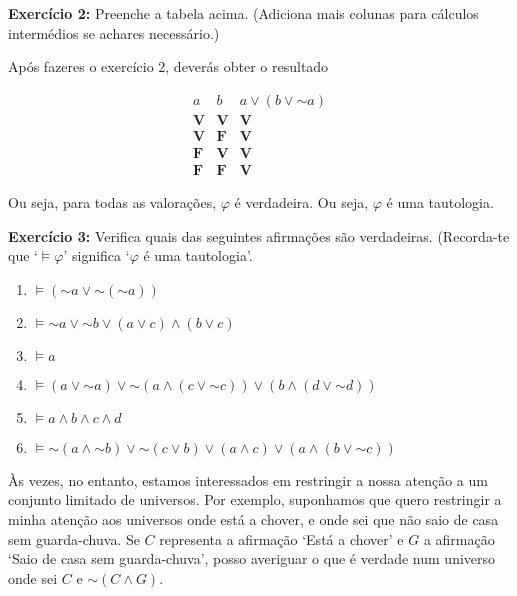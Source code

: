 \documentclass{article}
\theoremstyle{definition}
\theoremstyle{remark}
\newcommand{\V}{\mathbf{V}}
\newcommand{\F}{\mathbf{F}}
\newcommand*{\lneg}{\mathord{\sim}}
\begin{document}
	\textbf{Exercício 2:} Preenche a tabela acima. (Adiciona mais colunas para cálculos intermédios se achares necessário.)
	
	\smallskip
	
	Após fazeres o exercício 2, deverás obter o resultado
	
	\[
	\begin{array}{c|c|c}
	a & b & a \lor (b \lor \lneg a)\\
	\hline
	\V & \V &\V\\
	\V & \F &\V\\
	\F & \V &\V\\
	\F & \F &\V
	\end{array}
	\]
	
	Ou seja, para todas as valorações, $\varphi$ é verdadeira. Ou seja, $\varphi$ é uma tautologia.
	
	\smallskip
	
	\textbf{Exercício 3:} Verifica quais das seguintes afirmações são verdadeiras. (Recorda-te que `$\vDash \varphi$' significa `$\varphi$ é uma tautologia'.
	
	\begin{enumerate}
	\item $\vDash (\lneg a \lor \lneg (\lneg a))$
	
	\item $\vDash \lneg a \lor \lneg b \lor (a \lor c) \land (b \lor c)$
	
	\item $\vDash a$
	
	\item $\vDash (a \lor \lneg a) \lor \lneg (a \land (c \lor \lneg c)) \lor (b \land (d \lor \lneg d))$
	
	\item $\vDash a \land b \land c \land d$
	
	\item $\vDash \lneg (a \land \lneg b) \lor \lneg(c \lor b) \lor (a \land c) \lor (a \land (b \lor \lneg c))$
	\end{enumerate}
	
	
	Às vezes, no entanto, estamos interessados em restringir a nossa atenção a um conjunto limitado de universos. Por exemplo, suponhamos que quero restringir a minha atenção aos universos onde está a chover, e onde sei que não saio de casa sem guarda-chuva. Se $C$ representa a afirmação `Está a chover' e $G$ a afirmação `Saio de casa sem guarda-chuva', posso averiguar o que é verdade num universo onde sei $C$ e $\lneg (C \land G)$.
	
\end{document}
